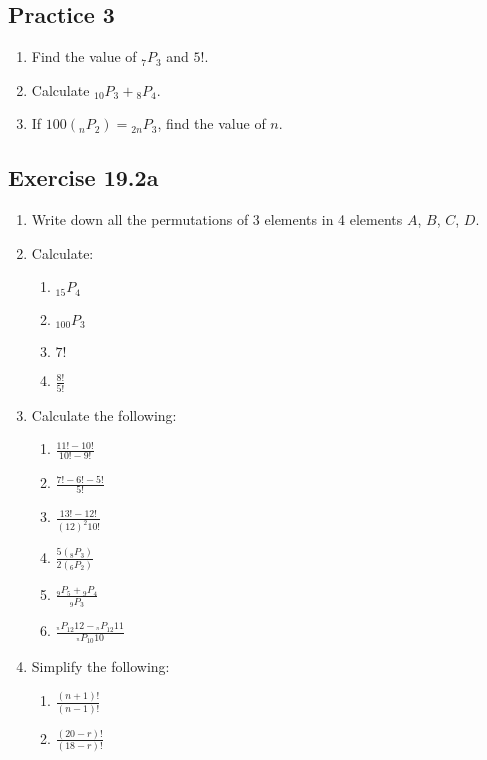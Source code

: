 \documentclass{report}
\newcommand\permtwo[2][^n]{{}_{#1}P_{#2}}
\begin{document}
\begin{multicols}{2}
  \subsection{Practice 3}

  \begin{enumerate}
    \item Find the value of $\permtwo[7]{3}$ and $5!$.
    \item Calculate $\permtwo[10]{3} + \permtwo[8]{4}$.
    \item If $100(\permtwo[n]{2}) = \permtwo[2n]{3}$, find the value of $n$.
  \end{enumerate}

  \subsection{Exercise 19.2a}

  \begin{enumerate}
    \item Write down all the permutations of 3 elements in 4 elements $A$, $B$, $C$, $D$.

    \item Calculate:
          \begin{enumerate}
            \item $\permtwo[15]{4}$
            \item $\permtwo[100]{3}$
            \item $7!$
            \item $\frac{8!}{5!}$
          \end{enumerate}

    \item Calculate the following:
          \begin{enumerate}
            \item $\frac{11! - 10!}{10! - 9!}$
            \item $\frac{7! - 6! - 5!}{5!}$
            \item $\frac{13! - 12!}{{(12)}^2 10!}$
            \item $\frac{5(\permtwo[8]{3})}{2(\permtwo[6]{2})}$
            \item $\frac{\permtwo[9]{5} + \permtwo[9]{4}}{\permtwo[9]{3}}$
            \item $\frac{\permtwo{12}{12} - \permtwo{12}{11}}{\permtwo{10}{10}}$
          \end{enumerate}

    \item Simplify the following:
          \begin{enumerate}
            \item $\frac{(n+1)!}{(n-1)!}$
            \item $\frac{(20 - r)!}{(18 - r)!}$
          \end{enumerate}
  \end{enumerate}


\end{multicols}
\end{document}
